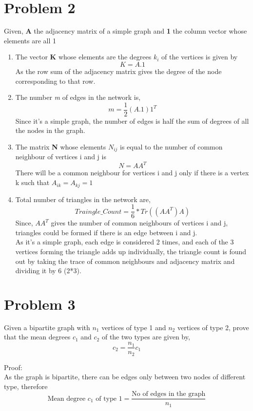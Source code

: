 \documentclass{article}
\begin{document}
\section*{Problem 2}
Given, \textbf{A} the adjacency matrix of a simple graph and \textbf{1} the column vector whose elements are all 1
\begin{enumerate}[label=(\alph*)]
\item
The vector \textbf{K} whose elements are the degrees $k_i$ of the vertices is given by
$$K = A . 1$$
As the row sum of the adjacency matrix gives the degree of the node corresponding to that row.

\item
The number \textit{m} of edges in the network is,
$$m = \dfrac{1}{2} (A . 1) 1^T$$
Since it's a simple graph, the number of edges is half the sum of degrees of all the nodes in the graph.

\item
The matrix \textbf{N} whose elements $N_{ij}$ is equal to the number of common neighbour of vertices i and j is
$$N = A  A^T$$ 
There will be a common neighbour for vertices i and j only if there is a vertex k such that $A_{ik} = A_{kj} = 1$

\item
Total number of triangles in the network are,
$$Traingle\_Count = \dfrac{1}{6} * Tr((A  A^T)A)$$
Since, $A A^T$ gives the number of common neighbours of vertices i and j, triangles could be formed if there is an edge between i and j.
\\As it's a simple graph, each edge is considered 2 times, and each of the 3 vertices forming the triangle adds up individually, the triangle count is found out by taking the trace of common neighbours and adjacency matrix and dividing it by 6 (2*3). 
\end{enumerate}

\section*{Problem 3}
Given a bipartite graph with $n_1$ vertices of type 1 and $n_2$ vertices of type 2, prove that the mean degrees $c_1$ and $c_2$ of the two types are given by,
$$ c_2 = \dfrac{n_1}{n_2} c_1$$

Proof:\\

As the graph is bipartite, there can be edges only between two nodes of different type, therefore
\begin{equation} \label{eq:1}
\text{Mean degree } c_1 \text{ of type 1} = \dfrac{\text{No of edges in the graph}}{n_1}
\end{equation}
\end{document}
